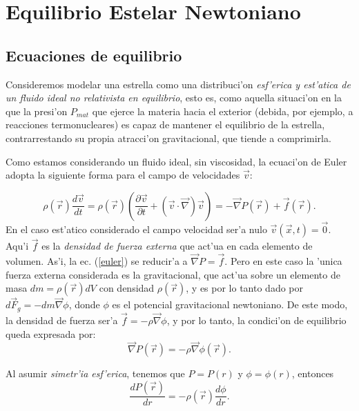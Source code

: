 \chapter{Equilibrio Estelar Newtoniano}\label{chap:eq_newton}

\section{Ecuaciones de equilibrio}
Consideremos modelar una estrella como una distribuci'on \textit{esf'erica y est'atica de un fluido ideal no relativista en equilibrio}, esto es, como aquella situaci'on en la que la presi'on $P_{mat}$ que ejerce la materia hacia el exterior (debida, por ejemplo, a reacciones termonucleares)  es capaz de mantener el equilibrio de la estrella, contrarrestando su propia
atracci'on gravitacional, que tiende a comprimirla.

Como estamos considerando un fluido ideal, sin viscosidad, la ecuaci'on de Euler adopta la siguiente forma para el campo de velocidades $\vec{v}$:

\begin{equation}\label{euler}
\rho(\vec{r})\frac{d\vec{v}}{dt}=\rho(\vec{r})\left( \dfrac{\partial\vec{v}}{\partial t}+(\vec{v}\cdot\vec{\nabla})\vec{v}\right)=-\vec{\nabla}P(\vec{r})+\vec{f} (\vec{r}).
\end{equation}
En el caso est'atico considerado el campo velocidad ser'a nulo $\vec{v}(\vec{x},t)=\vec{0}$. Aqu'i $\vec{f}$ es la \textit{densidad de fuerza externa} que act'ua en cada elemento de volumen. As'i, la ec. (\ref{euler}) se reducir'a a $\vec{\nabla}P=\vec{f}$. Pero en este caso la 'unica fuerza externa considerada es la gravitacional, que act'ua sobre un elemento de masa $dm=\rho(\vec{r})dV$ con densidad $\rho(\vec{r})$, y es por lo tanto dado por $d\vec{F}_g=-dm\vec{\nabla}\phi$, donde $\phi$ es el potencial gravitacional newtoniano. De este modo, la densidad de fuerza ser'a $\vec{f}=-\rho\vec{\nabla}\phi$, y por lo tanto, la condici'on de equilibrio queda expresada por:
\begin{equation}\label{equi}
\vec{\nabla}P(\vec{r})=-\rho\vec{\nabla}\phi(\vec{r}).
\end{equation}

Al asumir \textit{simetr'ia esf'erica}, tenemos que $P=P(r)$ y $\phi=\phi(r)$, entonces
\begin{equation}\label{equir}
\frac{dP(\vec{r})}{dr}=-\rho(\vec{r})\frac{d\phi}{dr}.
\end{equation}

